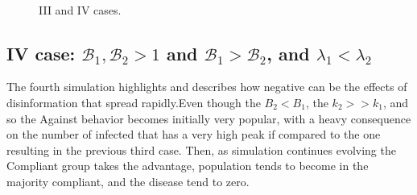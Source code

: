 \begin{figure}[h]
	\centering
	 \quad
	 \\
	\caption[Full model simulation figure second]{III and IV cases.}
	\label{fig:sim_B1_mag_B2}
\end{figure}


\subsection{IV case:  $\mathcal{B}_1, \mathcal{B}_2 >1$ and $\mathcal{B}_1 >  \mathcal{B}_2$, and $\lambda_1 < \lambda_2$}
The fourth simulation highlights and describes how negative can be the effects of disinformation that spread rapidly.Even though the $B_2 < B_1$, the $k_2 >> k_1$, and so the Against behavior becomes initially very popular, with a heavy consequence on the number of infected that has a very high peak if compared to the one resulting in the previous third case. Then, as simulation continues evolving the Compliant group takes the advantage, population tends to become in the majority compliant, and the disease tend to zero. 




